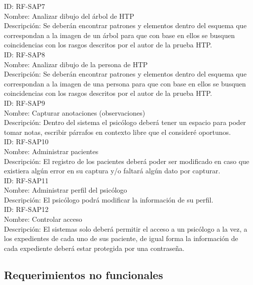 \noindent
ID: RF-SAP7\\
Nombre: Analizar dibujo del árbol de HTP\\
Descripción: Se deberán encontrar patrones y elementos dentro del esquema que correspondan a la imagen de un árbol para que con base en ellos se busquen coincidencias con los rasgos descritos por el autor de la prueba HTP. 
\\

\noindent
ID: RF-SAP8\\
Nombre: Analizar dibujo de la persona de HTP\\
Descripción: Se deberán encontrar patrones y elementos dentro del esquema que correspondan a la imagen de una persona para que con base en ellos se busquen coincidencias con los rasgos descritos por el autor de la prueba HTP. 
\\

\noindent
ID: RF-SAP9\\
Nombre: Capturar anotaciones (observaciones)\\
Descripción: Dentro del sistema el psicólogo deberá tener un espacio para poder tomar notas, escribir párrafos en contexto libre que el consideré oportunos.
\\

\noindent
ID: RF-SAP10\\
Nombre: Administrar pacientes\\
Descripción: El registro de los pacientes deberá poder ser modificado en caso que existiera algún error en su captura y/o faltará algún dato por capturar.
\\

\noindent
ID: RF-SAP11\\
Nombre: Administrar perfil del psicólogo\\
Descripción: El psicólogo podrá modificar la información de su perfil.
\\

\noindent
ID: RF-SAP12\\
Nombre: Controlar acceso\\
Descripción: El  sistemas  solo  deberá  permitir  el  acceso a un psicólogo a la vez,  a  los  expedientes  de  cada uno de sus paciente, de igual forma la información de cada expediente deberá estar protegida por una contraseña.
\\
\newpage
\subsection{Requerimientos no funcionales}

